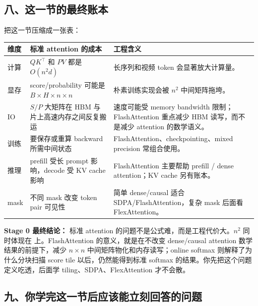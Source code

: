 \subsection{八、这一节的最终账本}

把这一节压缩成一张表：

\begin{center}
{\small
\begin{tabular}{p{3.2cm}p{4.2cm}p{5.3cm}}
\hline
\textbf{维度} & \textbf{标准 attention 的成本} & \textbf{工程含义} \\
\hline
计算 & $QK^\top$ 和 $PV$ 都是 $O(n^2d)$ & 长序列和视频 token 会显著放大计算量。 \\
显存 & score/probability 可能是 $B \times H \times n \times n$ & 朴素训练实现会被 $n^2$ 中间矩阵拖垮。 \\
IO & $S/P$ 大矩阵在 HBM 与片上高速内存之间反复搬运 & 速度可能受 memory bandwidth 限制；FlashAttention 重点减少 HBM 读写，而不是减少 attention 的数学语义。 \\
训练 & 要保存或重算 backward 所需中间状态 & FlashAttention、checkpointing、mixed precision 常组合使用。 \\
推理 & prefill 受长 prompt 影响，decode 受 KV cache 影响 & FlashAttention 主要帮助 prefill / dense attention；KV cache 另有账本。 \\
mask & 不同 mask 改变 token pair 可见性 & 简单 dense/causal 适合 SDPA/FlashAttention，复杂 mask 后面看 FlexAttention。 \\
\hline
\end{tabular}
}
\end{center}

\begin{conceptbox}
\textbf{Stage 0 最终结论：} 标准 attention 的问题不是公式难，而是工程代价大。$n^2$ 同时体现在 上。FlashAttention 的意义，就是在不改变 dense/causal attention 数学结果的前提下，减少 $n \times n$ 中间矩阵物化和内存读写；online softmax 则解释了为什么分块扫描 score tile 以后，仍然能得到标准 softmax 的结果。你先把这个问题定义吃透，后面学 tiling、SDPA、FlexAttention 才不会散。
\end{conceptbox}

\subsection{九、你学完这一节后应该能立刻回答的问题}

